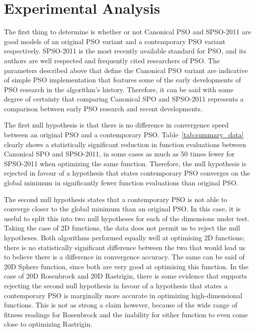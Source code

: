 \documentclass{csfourzero}
\begin{document}


\section{Experimental Analysis}

The first thing to determine is whether or not Canonical PSO and SPSO-2011
are good models of an original PSO variant and a contemporary PSO variant
respectively. SPSO-2011 is the most recently available standard for
PSO, and its authors are well respected and frequently cited researchers of PSO.
The parameters described above that define the Canonical PSO variant are
indicative of simple PSO implementation that features some of the early
developments of PSO research in the algorithm's history. Therefore, it can be
said with some degree of certainty that comparing Canonical SPO and SPSO-2011
represents a comparison between early PSO research and recent developments.

The first null hypothesis is that there is no difference in convergence speed
between an original PSO and a contemporary PSO. Table~\ref{tab:summary_data}
clearly shows a statistically significant reduction in function evaluations
between Canonical SPO and SPSO-2011, in some cases as much as 50 times fewer for
SPSO-2011 when optimizing the same function. Therefore, the null hypothesis is
rejected in favour of a hypothesis that states contemporary PSO converges on the
global minimum in significantly fewer function evaluations than original PSO.

The second null hypothesis states that a contemporary PSO is not able to
converge closer to the global minimum than an original PSO\@. In this case, it is
useful to split this into two null hypotheses for each of the dimensions under
test. Taking the case of 2D functions, the data does not permit us to reject the
null hypotheses. Both algorithms performed equally well at optimising 2D
functions; there is no statistically significant difference between the two that
would lead us to believe there is a difference in convergence accuracy. The same
can be said of 20D Sphere function, since both are very good at optimising this
function. In the case of 20D Rosenbrock and 20D Rastrigin, there is some
evidence that supports rejecting the second null hypothesis in favour of a
hypothesis that states a contemporary PSO is marginally more accurate in
optimizing high-dimensional functions. This is not as strong a claim however,
because of the wide range of fitness readings for Rosenbrock and the inability
for either function to even come close to optimizing Rastrigin.
\end{document}

